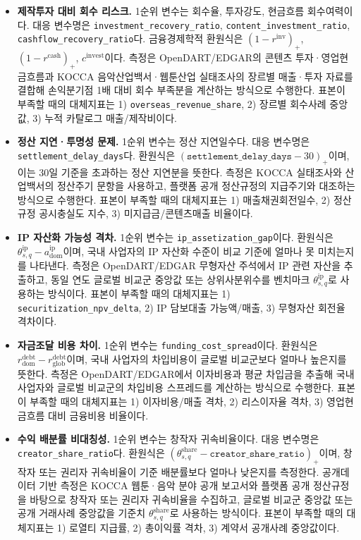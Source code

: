 \documentclass[11pt,a4paper]{report}
\begin{document}
\begin{table}[H]
  \centering
  \small
  \caption{\texorpdfstring{$I^{\mathrm{risk}}$ 요소별 산식 표}{Irisk 요소별 산식 표}}\label{tab:irisk_component_map}
\RaggedRight
\begin{itemize}[leftmargin=*, itemsep=0.7em]
  \item \textbf{제작투자 대비 회수 리스크.} 1순위 변수는 회수율, 투자강도, 현금흐름 회수여력이다. 대응 변수명은 \texttt{investment\_recovery\_ratio}, \texttt{content\_investment\_ratio}, \texttt{cashflow\_recovery\_ratio}다. 금융경제학적 환원식은 $(1-r^{\mathrm{inv}})_+$, $(1-r^{\mathrm{cash}})_+$, $c^{\mathrm{invest}}$이다. 측정은 OpenDART/EDGAR의 콘텐츠 투자·영업현금흐름과 KOCCA 음악산업백서·웹툰산업 실태조사의 장르별 매출·투자 자료를 결합해 손익분기점 1배 대비 회수 부족분을 계산하는 방식으로 수행한다. 표본이 부족할 때의 대체지표는 1) \texttt{overseas\_revenue\_share}, 2) 장르별 회수사례 중앙값, 3) 누적 카탈로그 매출/제작비이다.
  \item \textbf{정산 지연·투명성 문제.} 1순위 변수는 정산 지연일수다. 대응 변수명은 \texttt{settlement\_delay\_days}다. 환원식은 $(\texttt{settlement\_delay\_days}-30)_+$이며, 이는 30일 기준을 초과하는 정산 지연분을 뜻한다. 측정은 KOCCA 실태조사와 산업백서의 정산주기 문항을 사용하고, 플랫폼 공개 정산규정의 지급주기와 대조하는 방식으로 수행한다. 표본이 부족할 때의 대체지표는 1) 매출채권회전일수, 2) 정산규정 공시충실도 지수, 3) 미지급금/콘텐츠매출 비율이다.
  \item \textbf{IP 자산화 가능성 격차.} 1순위 변수는 \texttt{ip\_assetization\_gap}이다. 환원식은 $\theta^{\mathrm{ip}}_{s,q}-a^{\mathrm{ip}}_{\mathrm{dom}}$이며, 국내 사업자의 IP 자산화 수준이 비교 기준에 얼마나 못 미치는지를 나타낸다. 측정은 OpenDART/EDGAR 무형자산 주석에서 IP 관련 자산을 추출하고, 동일 연도 글로벌 비교군 중앙값 또는 상위사분위수를 벤치마크 $\theta^{\mathrm{ip}}_{s,q}$로 사용하는 방식이다. 표본이 부족할 때의 대체지표는 1) \texttt{securitization\_npv\_delta}, 2) IP 담보대출 가능액/매출, 3) 무형자산 회전율 격차이다.
  \item \textbf{자금조달 비용 차이.} 1순위 변수는 \texttt{funding\_cost\_spread}이다. 환원식은 $r^{\mathrm{debt}}_{\mathrm{dom}}-r^{\mathrm{debt}}_{\mathrm{glob}}$이며, 국내 사업자의 차입비용이 글로벌 비교군보다 얼마나 높은지를 뜻한다. 측정은 OpenDART/EDGAR에서 이자비용과 평균 차입금을 추출해 국내 사업자와 글로벌 비교군의 차입비용 스프레드를 계산하는 방식으로 수행한다. 표본이 부족할 때의 대체지표는 1) 이자비용/매출 격차, 2) 리스이자율 격차, 3) 영업현금흐름 대비 금융비용 비율이다.
  \item \textbf{수익 배분률 비대칭성.} 1순위 변수는 창작자 귀속비율이다. 대응 변수명은 \texttt{creator\_share\_ratio}다. 환원식은 $(\theta^{\mathrm{share}}_{s,q}-\texttt{creator\_share\_ratio})_+$이며, 창작자 또는 권리자 귀속비율이 기준 배분률보다 얼마나 낮은지를 측정한다. 공개데이터 기반 측정은 KOCCA 웹툰·음악 분야 공개 보고서와 플랫폼 공개 정산규정을 바탕으로 창작자 또는 권리자 귀속비율을 수집하고, 글로벌 비교군 중앙값 또는 공개 거래사례 중앙값을 기준치 $\theta^{\mathrm{share}}_{s,q}$로 사용하는 방식이다. 표본이 부족할 때의 대체지표는 1) 로열티 지급률, 2) 총이익률 격차, 3) 계약서 공개사례 중앙값이다.
\end{itemize}
\end{table}
\end{document}
